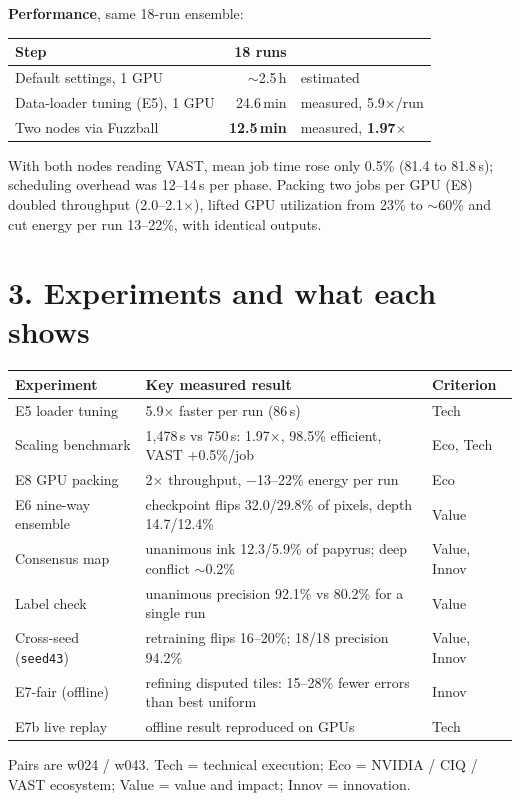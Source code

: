 \documentclass[9pt,letterpaper,twocolumn]{extarticle}
\begin{document}
\textbf{Performance}, same 18-run ensemble:
\begin{center}
\vspace{-4pt}\small
\begin{tabular}{@{}lrl@{}}
\toprule
\textbf{Step} & \textbf{18 runs} & \\
\midrule
Default settings, 1 GPU & $\sim$2.5\,h & estimated \\
Data-loader tuning (E5), 1 GPU & 24.6\,min & measured, 5.9$\times$/run \\
Two nodes via Fuzzball & \textbf{12.5\,min} & measured, \textbf{1.97$\times$} \\
\bottomrule
\end{tabular}\vspace{-3pt}
\end{center}
With both nodes reading VAST, mean job time rose only 0.5\% (81.4 to 81.8\,s); scheduling overhead was 12--14\,s per phase. Packing two jobs per GPU (E8) doubled throughput (2.0--2.1$\times$), lifted GPU utilization from 23\% to $\sim$60\% and cut energy per run 13--22\%, with identical outputs.

\section{3. Experiments and what each shows}
\begin{center}
\vspace{-3pt}\footnotesize
\begin{tabular}{@{}L{0.24\columnwidth}L{0.555\columnwidth}L{0.145\columnwidth}@{}}
\toprule
\textbf{Experiment} & \textbf{Key measured result} & \textbf{Criterion} \\
\midrule
E5 loader tuning & 5.9$\times$ faster per run (86\,s) & Tech \\
Scaling benchmark & 1,478\,s vs 750\,s: 1.97$\times$, 98.5\% efficient, VAST +0.5\%/job & Eco, Tech \\
E8 GPU packing & 2$\times$ throughput, $-$13--22\% energy per run & Eco \\
E6 nine-way ensemble & checkpoint flips 32.0/29.8\% of pixels, depth 14.7/12.4\% & Value \\
Consensus map & unanimous ink 12.3/5.9\% of papyrus; deep conflict $\sim$0.2\% & Value, Innov \\
Label check & unanimous precision 92.1\% vs 80.2\% for a single run & Value \\
Cross-seed (\texttt{seed43}) & retraining flips 16--20\%; 18/18 precision 94.2\% & Value, Innov \\
E7-fair (offline) & refining disputed tiles: 15--28\% fewer errors than best uniform & Innov \\
E7b live replay & offline result reproduced on GPUs & Tech \\
\bottomrule
\end{tabular}\vspace{-3pt}
\end{center}
{\footnotesize Pairs are w024 / w043. Tech = technical execution; Eco = NVIDIA / CIQ / VAST ecosystem; Value = value and impact; Innov = innovation.}
\end{document}
